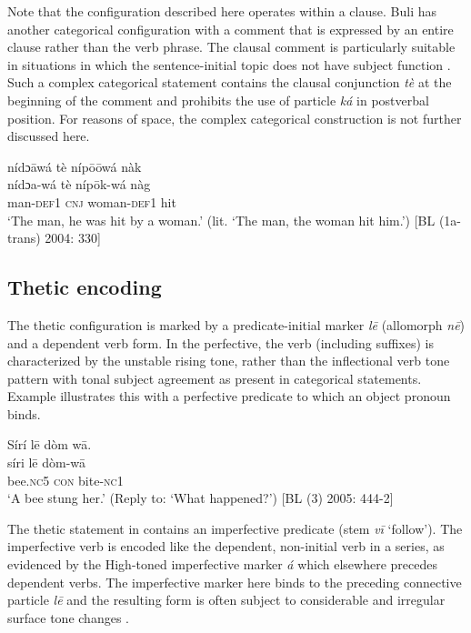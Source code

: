 \documentclass[output=paper]{langsci/langscibook}
\begin{document}
Note that the configuration described here operates within a clause. Buli has another categorical configuration with a comment that is expressed by an entire clause rather than the verb phrase. The clausal comment is particularly suitable in situations in which the sentence-initial topic does not have subject function . Such a complex categorical statement contains the clausal conjunction \textit{tè} at the beginning of the comment and prohibits the use of particle \textit{ká} in postverbal position. For reasons of space, the complex categorical construction is not further discussed here.

\ea\label{ex:schwarz:13}
\glll   nídɔ\={a}wá  tè  níp\={o}\={o}wá  nàk\\
  \textup{nídɔa-wá}  tè  níp\={o}k-wá  {nàg}\\
man-\textsc{def}1  \textsc{cnj}  woman-\textsc{def}1  hit\\
\glt ‘The man, he was hit by a woman.’ (lit. ‘The man, the woman hit him.’) [BL (1a-trans) 2004: 330]  
\z

\subsection{Thetic encoding}\label{sec:schwarz:3.3}

The thetic configuration is marked by a predicate-initial marker \textit{l\={e}} (allomorph \textit{n\={e}}) and a dependent verb form. In the perfective, the verb (including suffixes) is characterized by the unstable rising tone, rather than the inflectional verb tone pattern with tonal subject agreement as present in categorical statements. Example  illustrates this with a perfective predicate to which an object pronoun binds.

\ea\label{ex:schwarz:14}
\glll   Sírí    l\={e}  {dòm  w\={a}.}\\
    \textup{síri}    l\={e}  {dòm{-}w\={a}}\\
       bee.\textsc{nc}5  \textsc{con}  bite{-}\textsc{nc}1\\
\glt ‘A bee stung her.’ (Reply to: ‘What happened?’) [BL (3) 2005: 444-2]
\z

The thetic statement in  contains an imperfective predicate (stem \textit{v\={i}} ‘follow’). The imperfective verb is encoded like the dependent, non-initial verb in a series, as evidenced by the High-toned imperfective marker \textit{á} which elsewhere precedes dependent verbs. The imperfective marker here binds to the preceding connective particle \textit{l\={e}} and the resulting form is often subject to considerable and irregular surface tone changes \citep{Schwarz2007}.
\end{document}
